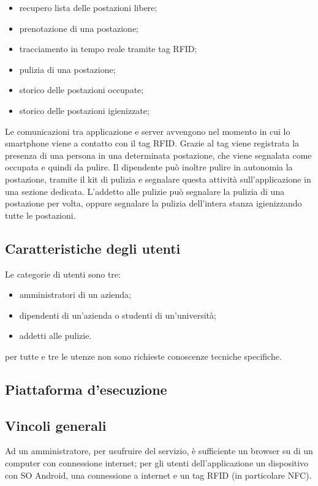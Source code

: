 \begin{itemize}
	\item recupero lista delle postazioni libere; \\
	\item prenotazione di una postazione; \\
	\item tracciamento in tempo reale tramite tag RFID; \\
	\item pulizia di una postazione; \\
	\item storico delle postazioni occupate; \\
	\item storico delle postazioni igienizzate; \\ 
\end{itemize}
Le comunicazioni tra applicazione e server avvengono nel momento in cui lo smartphone viene a contatto con il tag RFID. Grazie al tag viene registrata la presenza di una persona in una determinata postazione, che viene segnalata come occupata e quindi da pulire. Il dipendente può inoltre pulire in autonomia la postazione, tramite il kit di pulizia e segnalare questa attività sull’applicazione in una sezione dedicata.
L’addetto alle pulizie può segnalare la pulizia di una postazione per volta, oppure segnalare la pulizia dell’intera stanza igienizzando tutte le postazioni.

\subsection{Caratteristiche degli utenti}
Le categorie di utenti sono tre:
\begin{itemize}
	\item amministratori di un azienda;
	\item dipendenti di un'azienda o studenti di un'università; \item addetti alle pulizie.
\end{itemize}
per tutte e tre le utenze non sono richieste conoscenze tecniche specifiche.
\subsection{Piattaforma d'esecuzione}

\subsection{Vincoli generali}
Ad un amministratore, per usufruire del servizio, è sufficiente un browser su di un computer con connessione internet; per gli utenti dell'applicazione un dispositivo con SO Android, una connessione a internet e un tag RFID (in particolare NFC).